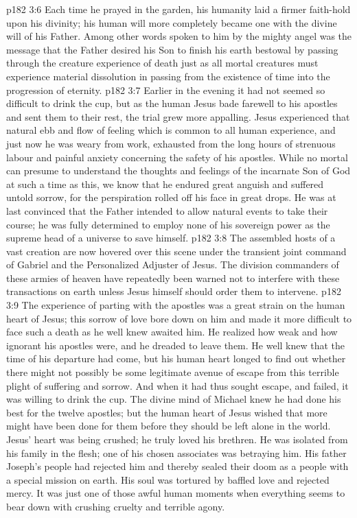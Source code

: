 \vs p182 3:6 Each time he prayed in the garden, his humanity laid a firmer faith\hyp{}hold upon his divinity; his human will more completely became one with the divine will of his Father. Among other words spoken to him by the mighty angel was the message that the Father desired his Son to finish his earth bestowal by passing through the creature experience of death just as all mortal creatures must experience material dissolution in passing from the existence of time into the progression of eternity.
\vs p182 3:7 Earlier in the evening it had not seemed so difficult to drink the cup, but as the human Jesus bade farewell to his apostles and sent them to their rest, the trial grew more appalling. Jesus experienced that natural ebb and flow of feeling which is common to all human experience, and just now he was weary from work, exhausted from the long hours of strenuous labour and painful anxiety concerning the safety of his apostles. While no mortal can presume to understand the thoughts and feelings of the incarnate Son of God at such a time as this, we know that he endured great anguish and suffered untold sorrow, for the perspiration rolled off his face in great drops. He was at last convinced that the Father intended to allow natural events to take their course; he was fully determined to employ none of his sovereign power as the supreme head of a universe to save himself.
\vs p182 3:8 The assembled hosts of a vast creation are now hovered over this scene under the transient joint command of Gabriel and the Personalized Adjuster of Jesus. The division commanders of these armies of heaven have repeatedly been warned not to interfere with these transactions on earth unless Jesus himself should order them to intervene.
\vs p182 3:9 \pc The experience of parting with the apostles was a great strain on the human heart of Jesus; this sorrow of love bore down on him and made it more difficult to face such a death as he well knew awaited him. He realized how weak and how ignorant his apostles were, and he dreaded to leave them. He well knew that the time of his departure had come, but his human heart longed to find out whether there might not possibly be some legitimate avenue of escape from this terrible plight of suffering and sorrow. And when it had thus sought escape, and failed, it was willing to drink the cup. The divine mind of Michael knew he had done his best for the twelve apostles; but the human heart of Jesus wished that more might have been done for them before they should be left alone in the world. Jesus’ heart was being crushed; he truly loved his brethren. He was isolated from his family in the flesh; one of his chosen associates was betraying him. His father Joseph’s people had rejected him and thereby sealed their doom as a people with a special mission on earth. His soul was tortured by baffled love and rejected mercy. It was just one of those awful human moments when everything seems to bear down with crushing cruelty and terrible agony.
